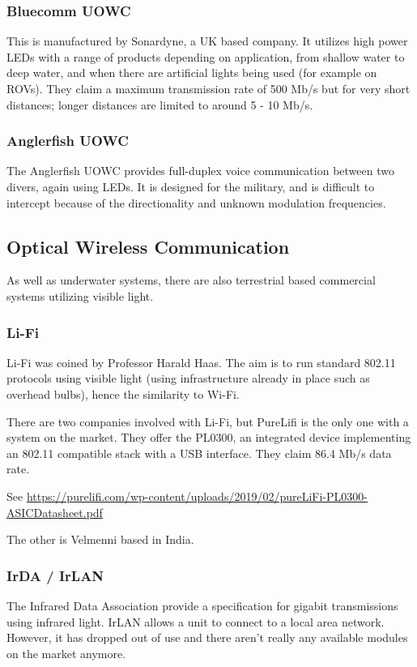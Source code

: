 \documentclass{article}
\begin{document}
\subsubsection{Bluecomm \ac{UOWC}}
This is manufactured by Sonardyne, a UK based company. It utilizes high power \ac{LED}s with a range of products depending on application, from shallow water to deep water, and when there are artificial lights being used (for example on \ac{ROV}s). They claim a maximum transmission rate of 500 Mb/s but for very short distances; longer distances are limited to around 5 - 10 Mb/s.

\subsubsection{Anglerfish \ac{UOWC}}
The Anglerfish \ac{UOWC} provides full-duplex voice communication between two divers, again using \ac{LED}s. It is designed for the military, and is difficult to intercept because of the directionality and unknown modulation frequencies.

\subsection{Optical Wireless Communication}
As well as underwater systems, there are also terrestrial based commercial systems utilizing visible light.

\subsubsection{Li-Fi}
Li-Fi was coined by Professor Harald Haas. The aim is to run standard 802.11 protocols using visible light (using infrastructure already in place such as overhead bulbs), hence the similarity to Wi-Fi.

There are two companies involved with Li-Fi, but PureLifi is the only one with a system on the market. They offer the PL0300, an integrated device implementing an 802.11 compatible stack with a USB interface. They claim 86.4 Mb/s data rate.

See \url{https://purelifi.com/wp-content/uploads/2019/02/pureLiFi-PL0300-ASICDatasheet.pdf}

The other is Velmenni based in India.

\subsubsection{IrDA / IrLAN}
The Infrared Data Association provide a specification for gigabit transmissions using infrared light. IrLAN allows a unit to connect to a local area network. However, it has dropped out of use and there aren't really any available modules on the market anymore.
\end{document}
